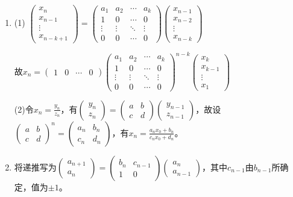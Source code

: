 \documentclass[a4paper,UTF8,fontset=windows]{ctexart}
\begin{document}
\begin{enumerate}
\item
(1) $\begin{pmatrix}x_n\\x_{n-1}\\\vdots\\x_{n-k+1}\end{pmatrix}=\begin{pmatrix}a_1&a_2&\cdots&a_k\\1&0&\cdots&0\\\vdots&\vdots&\ddots&\vdots\\0&0&\cdots&0\end{pmatrix}\begin{pmatrix}x_{n-1}\\x_{n-2}\\\vdots\\x_{n-k}\end{pmatrix}$

故$x_n=\begin{pmatrix}1&0&\cdots&0\end{pmatrix}\begin{pmatrix}a_1&a_2&\cdots&a_k\\1&0&\cdots&0\\\vdots&\vdots&\ddots&\vdots\\0&0&\cdots&0\end{pmatrix}^{n-k}\begin{pmatrix}x_k\\x_{k-1}\\\vdots\\x_1\end{pmatrix}$

(2)令$x_n=\frac{y_n}{z_n}$，有$\begin{pmatrix}y_n\\z_n\end{pmatrix}=\begin{pmatrix}a&b\\c&d\end{pmatrix}\begin{pmatrix}y_{n-1}\\z_{n-1}\end{pmatrix}$，故设$\begin{pmatrix}a&b\\c&d\end{pmatrix}^n=\begin{pmatrix}a_n&b_n\\c_n&d_n\end{pmatrix}$，有$x_n=\frac{a_nx_0+b_n}{c_nx_0+d_n}$。

\item
将递推写为$\begin{pmatrix}a_{n+1}\\a_n\end{pmatrix}=\begin{pmatrix}b_n&c_{n-1}\\1&0\end{pmatrix}\begin{pmatrix}a_n\\a_{n-1}\end{pmatrix}$，其中$c_{n-1}$由$b_{n-1}$所确定，值为$\pm1$。


\end{enumerate}
\end{document}
